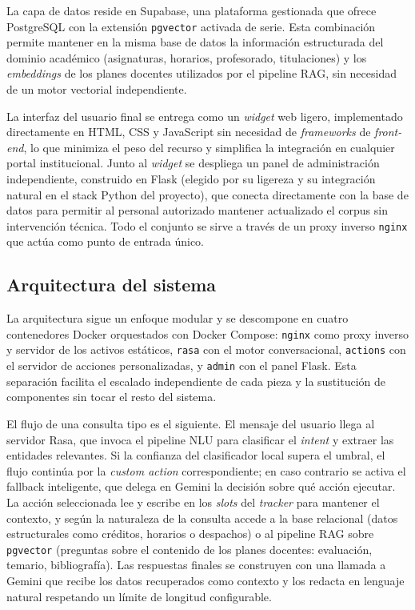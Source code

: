 La capa de datos reside en Supabase, una plataforma gestionada que ofrece PostgreSQL con la extensión \texttt{pgvector} activada de serie. Esta combinación permite mantener en la misma base de datos la información estructurada del dominio académico (asignaturas, horarios, profesorado, titulaciones) y los \textit{embeddings} de los planes docentes utilizados por el pipeline RAG, sin necesidad de un motor vectorial independiente.

La interfaz del usuario final se entrega como un \textit{widget} web ligero, implementado directamente en HTML, CSS y JavaScript sin necesidad de \textit{frameworks} de \textit{front-end}, lo que minimiza el peso del recurso y simplifica la integración en cualquier portal institucional. Junto al \textit{widget} se despliega un panel de administración independiente, construido en Flask (elegido por su ligereza y su integración natural en el stack Python del proyecto), que conecta directamente con la base de datos para permitir al personal autorizado mantener actualizado el corpus sin intervención técnica. Todo el conjunto se sirve a través de un proxy inverso \texttt{nginx} que actúa como punto de entrada único.

\subsection{Arquitectura del sistema}

La arquitectura sigue un enfoque modular y se descompone en cuatro contenedores Docker orquestados con Docker Compose: \texttt{nginx} como proxy inverso y servidor de los activos estáticos, \texttt{rasa} con el motor conversacional, \texttt{actions} con el servidor de acciones personalizadas, y \texttt{admin} con el panel Flask. Esta separación facilita el escalado independiente de cada pieza y la sustitución de componentes sin tocar el resto del sistema.

El flujo de una consulta tipo es el siguiente. El mensaje del usuario llega al servidor Rasa, que invoca el pipeline NLU para clasificar el \textit{intent} y extraer las entidades relevantes. Si la confianza del clasificador local supera el umbral, el flujo continúa por la \textit{custom action} correspondiente; en caso contrario se activa el fallback inteligente, que delega en Gemini la decisión sobre qué acción ejecutar. La acción seleccionada lee y escribe en los \textit{slots} del \textit{tracker} para mantener el contexto, y según la naturaleza de la consulta accede a la base relacional (datos estructurales como créditos, horarios o despachos) o al pipeline RAG sobre \texttt{pgvector} (preguntas sobre el contenido de los planes docentes: evaluación, temario, bibliografía). Las respuestas finales se construyen con una llamada a Gemini que recibe los datos recuperados como contexto y los redacta en lenguaje natural respetando un límite de longitud configurable.

